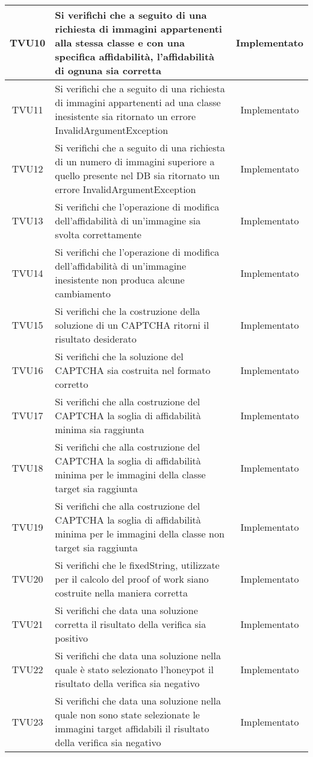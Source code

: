 \begin{center}
\begin{xltabular}{\textwidth}{|c|X|c|}
		\hline
		TVU10 &  Si verifichi che a seguito di una richiesta di immagini appartenenti alla stessa classe e con una specifica affidabilità, l'affidabilità di ognuna sia corretta & Implementato\\
		\hline
		TVU11 &  Si verifichi che a seguito di una richiesta di immagini appartenenti ad una classe inesistente sia ritornato un errore InvalidArgumentException & Implementato\\
		\hline
		TVU12 &  Si verifichi che a seguito di una richiesta di un numero di immagini superiore a quello presente nel DB sia ritornato un errore InvalidArgumentException & Implementato\\
		\hline
		TVU13 &  Si verifichi che l'operazione di modifica dell'affidabilità di un'immagine sia svolta correttamente & Implementato\\
		\hline
		TVU14 &  Si verifichi che l'operazione di modifica dell'affidabilità di un'immagine inesistente non produca alcune cambiamento & Implementato\\
		\hline
		TVU15 &  Si verifichi che la costruzione della soluzione di un CAPTCHA ritorni il risultato desiderato & Implementato\\
		\hline
		TVU16 &  Si verifichi che la soluzione del CAPTCHA sia costruita nel formato corretto & Implementato\\
		\hline
		TVU17 &  Si verifichi che alla costruzione del CAPTCHA la soglia di affidabilità minima sia raggiunta & Implementato\\
		\hline
		TVU18 &  Si verifichi che alla costruzione del CAPTCHA la soglia di affidabilità minima per le immagini della classe target sia raggiunta & Implementato\\
		\hline
		TVU19 &  Si verifichi che alla costruzione del CAPTCHA la soglia di affidabilità minima per le immagini della classe non target sia raggiunta & Implementato\\
		\hline
		TVU20 &  Si verifichi che le fixedString, utilizzate per il calcolo del proof of work siano costruite nella maniera corretta & Implementato\\
		\hline
		TVU21 & Si verifichi che data una soluzione corretta il risultato della verifica sia positivo  & Implementato\\
		\hline
		TVU22 & Si verifichi che data una soluzione nella quale è stato selezionato l'honeypot il risultato della verifica sia negativo  & Implementato\\
		\hline
		TVU23 & Si verifichi che data una soluzione nella quale non sono state selezionate le immagini target affidabili il risultato della verifica sia negativo  & Implementato\\

\end{xltabular}
\end{center}
